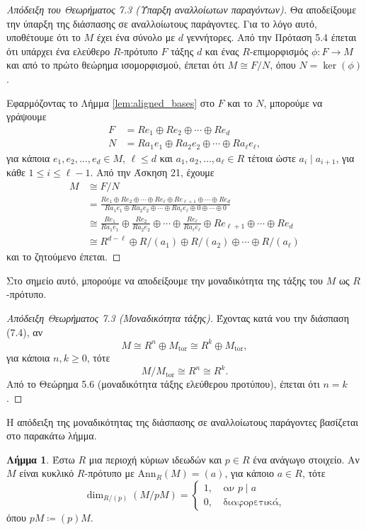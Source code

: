 \documentclass[12pt,a4paper,reqno]{amsart}
\theoremstyle{definition}
\newtheorem{lemma}[theorem]{Λήμμα}
\theoremstyle{remark}
\numberwithin{theorem}{section}
\numberwithin{exercise}{section}
\numberwithin{equation}{section}
\renewcommand{\to}{\rightarrow}
\newcommand{\Ann}{\mathrm{Ann}}
\newcommand{\tor}{\mathrm{tor}}
\begin{document}
\begin{proof}[Απόδειξη του Θεωρήματος 7.3 (Ύπαρξη αναλλοίωτων παραγόντων)]
    Θα αποδείξουμε την ύπα\-ρξη της διάσπασης σε αναλλοίωτους παράγοντες. Για το λόγο αυτό, υποθέτουμε ότι το $M$ έχει ένα σύνολο με $d$ γεννήτορες. Από την Πρόταση 5.4 έπεται ότι υπάρχει ένα ελεύθερο $R$-πρότυπο $F$ τάξης $d$ και ένας $R$-επιμορφισμός $\phi : F \to M$ και από το πρώτο θεώρημα ισομορφισμού, έπεται ότι $M \cong F/N$, όπου $N = \ker(\phi)$.

    Εφαρμόζοντας το Λήμμα \ref{lem:aligned_bases} στο $F$ και το $N$, μπορούμε να γράψουμε 
    \begin{align*}
    F &= Re_1 \oplus Re_2 \oplus \cdots \oplus Re_d \\
    N &= Ra_1e_1 \oplus Ra_2e_2 \oplus \cdots \oplus Ra_\ell{e_\ell},
    \end{align*}
    για κάποια $e_1, e_2, \dots, e_d \in M$, $\ell \le d$ και $a_1, a_2, \dots, a_\ell \in R$ τέτοια ώστε $a_i \mid a_{i+1}$, για κάθε $1 \le i \le \ell-1$. Από την Άσκηση 21, έχουμε
    \begin{align*}
        M &\cong F/N \\
        &= \frac{Re_1 \oplus Re_2 \oplus \cdots \oplus Re_\ell \oplus Re_{\ell+1} \oplus \cdots \oplus Re_d}{Ra_1e_1 \oplus Ra_2e_2 \oplus \cdots \oplus Ra_\ell{e_\ell}\oplus 0 \oplus \cdots \oplus 0} \\
        &\cong \frac{Re_1}{Ra_1e_1} \oplus \frac{Re_2}{Ra_2e_2} \oplus \cdots \oplus \frac{Re_\ell}{Ra_\ell e_\ell} \oplus Re_{\ell+1} \oplus \cdots \oplus Re_{d} \\
        &\cong R^{d-\ell} \oplus R/(a_1) \oplus R/(a_2) \oplus \cdots \oplus R/(a_\ell)
    \end{align*}
    και το ζητούμενο έπεται.
\end{proof}

Στο σημείο αυτό, μπορούμε να αποδείξουμε την μοναδικότητα της τάξης του $M$ ως $R$-πρότυπο.
\begin{proof}[Απόδειξη Θεωρήματος 7.3 (Μοναδικότητα τάξης)]
    Έχοντας κατά νου την διάσπαση (7.4), αν
    \[
    M \cong R^n \oplus M_\tor \cong R^k \oplus M_\tor,  
    \]
    για κάποια $n, k \ge 0$, τότε 
    \[
    M/M_\tor \cong R^n \cong R^k.
    \]
    Από το Θεώρημα 5.6 (μοναδικότητα τάξης ελεύθερου προτύπου), έπεται ότι $n=k$.
\end{proof}

Η απόδειξη της μοναδικότητας της διάσπασης σε αναλλοίωτους παράγοντες βασίζεται στο παρακάτω λήμμα. 
\begin{lemma}
    \label{lem:uniqueness_of_invariant_factors}
    Έστω $R$ μια περιοχή κύριων ιδεωδών και $p \in R$ ένα ανάγωγο στοιχείο. Αν $M$ είναι κυκλικό $R$-πρότυπο με $\Ann_R(M) = (a)$, για κάποιο $a \in R$, τότε 
    \[
    \dim_{R/(p)}\left(
        M/pM
    \right) = \begin{cases}
        1, &\ \text{αν $p \mid a$} \\
        0, &\ \text{διαφορετικά},
    \end{cases}
    \]
    όπου $pM \coloneqq (p)M$.
\end{lemma}
\end{document}
